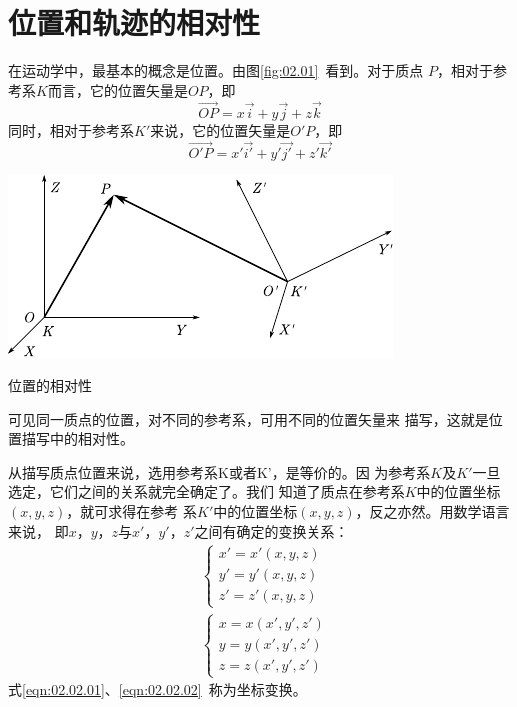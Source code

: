 \section{位置和轨迹的相对性}\label{sec:02.02}
在运动学中，最基本的概念是位置。由图\ref{fig:02.01}~看到。对于质点
$P$，相对于参考系$K$而言，它的位置矢量是$OP$，即
\begin{equation*}
    \vec{OP}=x\vec{i}+y\vec{j}+z\vec{k}
\end{equation*}
同时，相对于参考系$K'$来说，它的位置矢量是$O'P$，即
\begin{equation*}
    \vec{O'P}=x'\vec{i'}+y'\vec{j'}+z'\vec{k'}
\end{equation*}
\begin{figurex}
    \centering
    \includegraphics{figure/fig02.01}
    \caption{位置的相对性}
    \label{fig:02.01}
\end{figurex}

可见同一质点的位置，对不同的参考系，可用不同的位置矢量来
描写，这就是位置描写中的相对性。

从描写质点位置来说，选用参考系K或者K'，是等价的。因
为参考系$K$及$K'$一旦选定，它们之间的关系就完全确定了。我们
知道了质点在参考系$K$中的位置坐标$(x,y,z)$，就可求得在参考
系$K'$中的位置坐标$(x,y,z)$，反之亦然。用数学语言来说，
即$x$，$y$，$z$与$x'$，$y'$，$z'$之间有确定的变换关系：
\begin{align}
    \label{eqn:02.02.01}
    &\left\{\begin{array}{l}
        x'=x'(x, y, z) \\
        y'=y'(x, y, z) \\
        z'=z'(x, y, z)
    \end{array}\right. \\
    \label{eqn:02.02.02}
    &\left\{\begin{array}{l}
    x=x(x', y', z') \\
    y=y(x', y', z') \\
    z=z(x', y', z')
    \end{array}\right.
\end{align}
式\eqref{eqn:02.02.01}、\eqref{eqn:02.02.02}~称为坐标变换。

